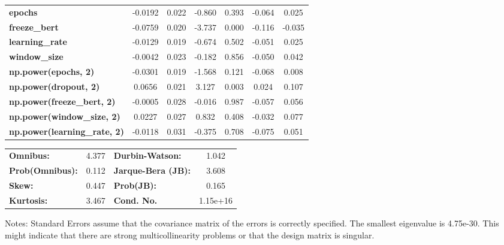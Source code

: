 \begin{center}
\begin{tabular}{lcccccc}
\textbf{epochs}                            &      -0.0192  &        0.022     &    -0.860  &         0.393        &       -0.064    &        0.025     \\
\textbf{freeze\_bert}                      &      -0.0759  &        0.020     &    -3.737  &         0.000        &       -0.116    &       -0.035     \\
\textbf{learning\_rate}                    &      -0.0129  &        0.019     &    -0.674  &         0.502        &       -0.051    &        0.025     \\
\textbf{window\_size}                      &      -0.0042  &        0.023     &    -0.182  &         0.856        &       -0.050    &        0.042     \\
\textbf{np.power(epochs, 2)}               &      -0.0301  &        0.019     &    -1.568  &         0.121        &       -0.068    &        0.008     \\
\textbf{np.power(dropout, 2)}              &       0.0656  &        0.021     &     3.127  &         0.003        &        0.024    &        0.107     \\
\textbf{np.power(freeze\_bert, 2)}         &      -0.0005  &        0.028     &    -0.016  &         0.987        &       -0.057    &        0.056     \\
\textbf{np.power(window\_size, 2)}         &       0.0227  &        0.027     &     0.832  &         0.408        &       -0.032    &        0.077     \\
\textbf{np.power(learning\_rate, 2)}       &      -0.0118  &        0.031     &    -0.375  &         0.708        &       -0.075    &        0.051     \\
\bottomrule
\end{tabular}
\begin{tabular}{lclc}
\textbf{Omnibus:}       &  4.377 & \textbf{  Durbin-Watson:     } &    1.042  \\
\textbf{Prob(Omnibus):} &  0.112 & \textbf{  Jarque-Bera (JB):  } &    3.608  \\
\textbf{Skew:}          &  0.447 & \textbf{  Prob(JB):          } &    0.165  \\
\textbf{Kurtosis:}      &  3.467 & \textbf{  Cond. No.          } & 1.15e+16  \\
\bottomrule
\end{tabular}
\end{center}

Notes: \newline
 [1] Standard Errors assume that the covariance matrix of the errors is correctly specified. \newline
 [2] The smallest eigenvalue is 4.75e-30. This might indicate that there are \newline
 strong multicollinearity problems or that the design matrix is singular.